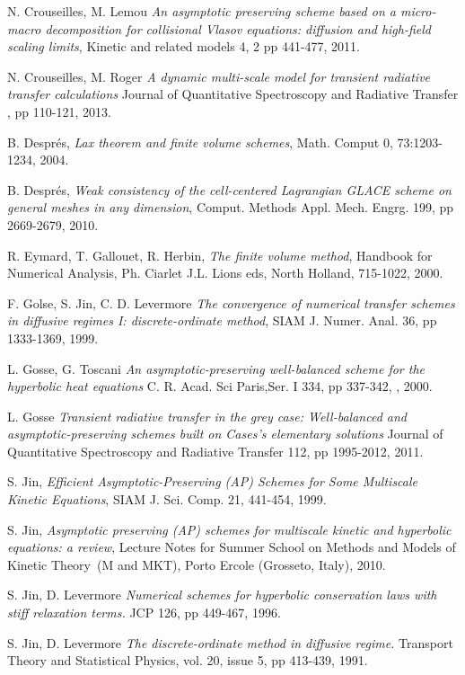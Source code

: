 \documentclass[a4paper,french,english,10pt]{article}
\begin{document}
{\begin{thebibliography}{abcde}
 N. Crouseilles, M. Lemou \emph{An asymptotic preserving
scheme based on a micro-macro decomposition for collisional Vlasov equations:
diffusion and high-field scaling limits}, Kinetic and related models 4, 2 
pp 441-477, 2011.

 N. Crouseilles, M. Roger \emph{A dynamic multi-scale
model for transient radiative transfer calculations} Journal of Quantitative
Spectroscopy and Radiative Transfer , pp 110-121, 2013.

 B. Despr\'es,  \emph{Lax theorem and finite volume
schemes},
Math. Comput 0, 73:1203-1234, 2004.

 B. Despr\'es,  \emph{Weak consistency of the cell-centered
Lagrangian GLACE scheme on general
meshes in any dimension}, Comput. Methods Appl. Mech. Engrg. 199, pp 
2669-2679, 2010.

 R. Eymard, T. Gallouet, R. Herbin, \emph{The finite volume
method}, Handbook for Numerical Analysis, Ph. Ciarlet J.L. Lions eds, North
Holland, 715-1022, 2000.


 F. Golse, S. Jin, C. D. Levermore \emph{The convergence
of numerical transfer schemes in diffusive regimes I: discrete-ordinate method},
SIAM J. Numer. Anal. 36, pp 1333-1369, 1999.

 L. Gosse, G. Toscani \emph{An asymptotic-preserving
well-balanced scheme for the hyperbolic heat equations} C. R. Acad. Sci
Paris,Ser. I 334, pp  337-342, , 2000.

 L. Gosse \emph{Transient radiative transfer in the grey
case: Well-balanced and asymptotic-preserving schemes built on Cases's
elementary solutions} Journal of Quantitative Spectroscopy and Radiative
Transfer 112, pp 1995-2012, 2011.

 S. Jin, \emph{Efficient Asymptotic-Preserving (AP)
Schemes for Some Multiscale Kinetic Equations},  SIAM J. Sci. Comp. 21, 441-454,
1999.

 S. Jin, \emph{Asymptotic preserving (AP) schemes for
multiscale kinetic and hyperbolic equations: a review}, Lecture Notes for Summer
School on \og Methods and Models of Kinetic Theory\fg\, (M and MKT), Porto
Ercole (Grosseto, Italy),  2010.

 S. Jin, D. Levermore \emph{Numerical schemes for
hyperbolic conservation laws with stiff relaxation terms.} JCP 126, pp 449-467,
1996.

 S. Jin, D. Levermore \emph{The discrete-ordinate method in
diffusive regime.} Transport Theory and Statistical Physics, vol. 20, issue 5,
pp 413-439, 1991.



\end{thebibliography}}
\end{document}

